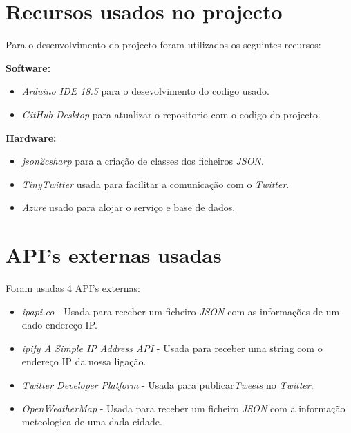 \documentclass[11pt]{report}
\begin{document}
\chapter*{Recursos usados no projecto}

Para o desenvolvimento do projecto foram utilizados os seguintes recursos:

\textbf{Software:}
\begin{itemize}
\item \textit{Arduino IDE 18.5} para o desevolvimento do codigo usado.
\item \textit{GitHub Desktop} para atualizar o repositorio com o codigo do projecto.
\end{itemize}

\textbf{Hardware:}
\begin{itemize}
\item \textit{json2csharp} para a criação de classes dos ficheiros \textit{JSON}. \cite{json2csharp}
\item \textit{TinyTwitter} usada para facilitar a comunicação com o \textit{Twitter}.\cite{TinyTwitter}
\item \textit{Azure} usado para alojar o serviço e base de dados. \cite{TinyTwitter}
\end{itemize}



\chapter*{API's externas usadas}

Foram usadas 4 API's externas:

\begin{itemize}
\item \textit{ipapi.co} - Usada para receber um ficheiro \textit{JSON} com as informações de um dado endereço IP.\cite{ipapi}
\item \textit{ipify  A  Simple IP Address API} - Usada para receber uma string com o endereço IP da nossa ligação.\cite{ipify}
\item \textit{Twitter Developer Platform} - Usada para publicar\textit{Tweets}  no \textit{Twitter}. \cite{twitter}
\item \textit{OpenWeatherMap} - Usada para receber um ficheiro \textit{JSON} com a informação meteologica de uma dada cidade. \cite{Weather}
\end{itemize}
\end{document}

